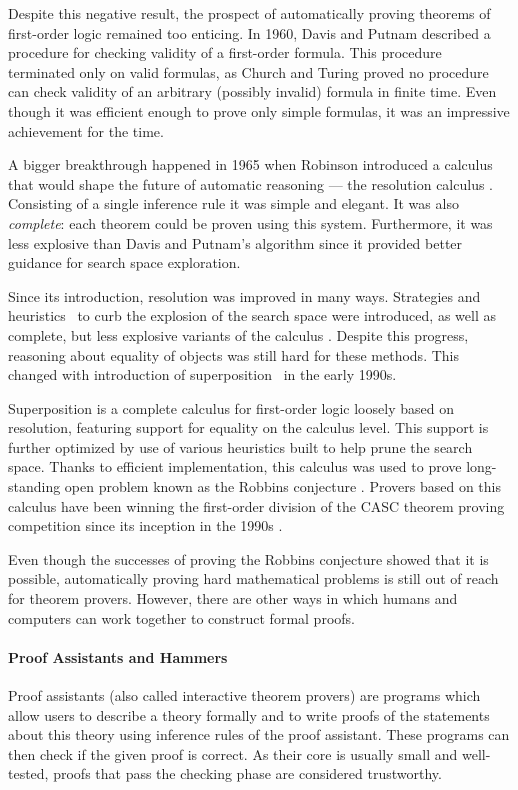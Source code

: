 Despite this negative result, the prospect of automatically proving theorems of
first-order logic remained too enticing. In 1960, Davis and Putnam
\cite{dp-60-dp} described a procedure for checking validity of a first-order
formula. This procedure terminated only on valid formulas, as Church and Turing
proved no procedure can check validity of an arbitrary (possibly invalid) formula
in finite time. Even though it was efficient enough to prove only simple
formulas, it was an impressive achievement for the time.

A bigger breakthrough happened in 1965 when Robinson introduced a calculus that
would shape the future of automatic reasoning --- the resolution calculus
\cite{ar-65-resolution}. Consisting of a single inference rule it was simple and
elegant. It was also \emph{complete}: each theorem could be proven using this
system. Furthermore, it was less explosive than Davis and Putnam's algorithm
since it provided better guidance for search space exploration.

Since its introduction, resolution was improved in many ways. Strategies and
heuristics~\cite{lw-65-sos} to curb the explosion of the search space were
introduced, as well as complete, but less explosive variants of the calculus
\cite{cc-73-resolution-book}. Despite this progress, reasoning about equality of
objects was still hard for these methods. This changed with introduction of
superposition~\cite{bg-94-superposition} in the early 1990s.

Superposition is a complete calculus for first-order logic loosely based on
resolution, featuring support for equality on the calculus level. This support
is further optimized by use of various heuristics built to help prune the
search space. Thanks to efficient implementation, this calculus was used to
prove long-standing open problem known as the Robbins conjecture
\cite{mccune-97-robbins}. Provers based on this calculus have been
winning the first-order division of the CASC theorem proving competition since its
inception in the 1990s \cite{ss-96-casc}.

Even though the successes of proving the Robbins conjecture showed that it is
possible, automatically proving hard mathematical problems is still out of reach
for theorem provers. However, there are other ways in which humans and computers can work together to construct formal
proofs.

\paragraph{Proof Assistants and Hammers} Proof assistants (also called interactive
theorem provers) are programs which allow users to describe a theory formally
and to write proofs of the statements about this theory using inference 
rules of the proof assistant. These programs can then check if the given proof
is correct. As their core is usually small and well-tested, proofs that pass the
checking phase are considered trustworthy.

